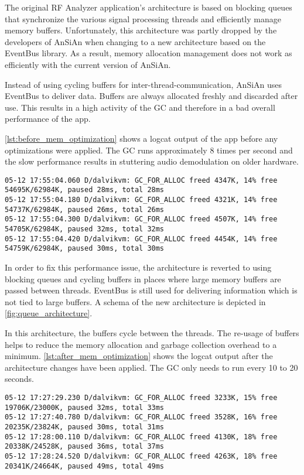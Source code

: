 The original RF Analyzer application's architecture is based on
blocking queues that synchronize the various signal processing threads
and efficiently manage memory buffers. Unfortunately, this
architecture was partly dropped by the developers of \ac{AnSiAn} when
changing to a new architecture based on the EventBus library. As a result, memory
allocation management does not work as efficiently with the current version
of \ac{AnSiAn}.

Instead of using cycling buffers for inter-thread-communication, \ac{AnSiAn} uses
EventBus to deliver data. Buffers are always allocated freshly
and discarded after use. This results in a high activity of the
\ac{GC} and therefore in a bad overall performance of the app.

\autoref{lst:before_mem_optimization} shows a logcat output of the
app before any optimizations were applied. The \ac{GC} runs approximately 8 times per second
and the slow performance results in stuttering audio demodulation on
older hardware.

\begin{lstlisting}[label=lst:before_mem_optimization, caption=Logcat output
before memory optimizations, language=none]
05-12 17:55:04.060 D/dalvikvm: GC_FOR_ALLOC freed 4347K, 14% free 54695K/62984K, paused 28ms, total 28ms
05-12 17:55:04.180 D/dalvikvm: GC_FOR_ALLOC freed 4321K, 14% free 54737K/62984K, paused 26ms, total 26ms
05-12 17:55:04.300 D/dalvikvm: GC_FOR_ALLOC freed 4507K, 14% free 54705K/62984K, paused 32ms, total 32ms
05-12 17:55:04.420 D/dalvikvm: GC_FOR_ALLOC freed 4454K, 14% free 54759K/62984K, paused 30ms, total 30ms
\end{lstlisting}

In order to fix this performance issue, the architecture is reverted
to using blocking queues and cycling buffers in places where large memory buffers are passed
between threads. EventBus is still used for delivering information
which is not tied to large buffers. A schema of the new architecture
is depicted in \autoref{fig:queue_architecture}. 

In this architecture, the buffers cycle between the threads. The re-usage
of buffers helps to reduce the memory allocation and garbage collection
overhead to a minimum. \autoref{lst:after_mem_optimization} shows the
logcat output after the architecture changes have been applied. The \ac{GC}
only needs to run every 10 to 20 seconds.


\begin{lstlisting}[label=lst:after_mem_optimization, caption=Logcat output
after memory optimizations, language=none]
05-12 17:27:29.230 D/dalvikvm: GC_FOR_ALLOC freed 3233K, 15% free 19706K/23000K, paused 32ms, total 33ms
05-12 17:27:40.780 D/dalvikvm: GC_FOR_ALLOC freed 3528K, 16% free 20235K/23824K, paused 30ms, total 31ms
05-12 17:28:00.110 D/dalvikvm: GC_FOR_ALLOC freed 4130K, 18% free 20338K/24528K, paused 36ms, total 37ms
05-12 17:28:24.520 D/dalvikvm: GC_FOR_ALLOC freed 4263K, 18% free 20341K/24664K, paused 49ms, total 49ms
\end{lstlisting}


%
